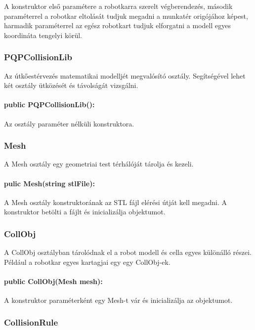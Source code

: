 A konstruktor első paramétere a robotkarra szerelt végberendezés, második paraméterrel a robotkar eltolását tudjuk megadni a munkatér origójához képest, harmadik paraméterrel az egész robotkart tudjuk elforgatni a modell egyes koordináta tengelyi körül.

\subsubsection*{PQPCollisionLib}

Az útkőestérvezés matematikai modelljét megvalósító osztály. Segítségével lehet két osztály ütközését és távolságát vizsgálni.

\paragraph{public PQPCollisionLib():} Az osztály paraméter nélküli konstruktora.

\subsubsection*{Mesh}
A Mesh osztály egy geometriai test térhálóját tárolja és kezeli.

\paragraph{pulic Mesh(string stlFile):} 

A Mesh osztály konstruktorának az STL fájl elérési útját kell megadni. A konstruktor betölti a fájlt és inicializálja objektumot.
 
\subsubsection*{CollObj}

A CollObj osztályban tárolódnak el a robot modell és cella egyes különálló részei. Például a robotkar egyes kartagjai egy egy CollObj-ek.   

\paragraph{public CollObj(Mesh mesh):}

A konstruktor paraméterként egy Mesh-t vár és inicializálja az objektumot.  

\subsubsection*{CollisionRule}

